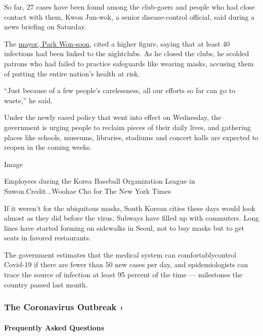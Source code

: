 So far, 27 cases have been found among the club-goers and people who had
close contact with them, Kwon Jun-wok, a senior disease-control
official, said during a news briefing on Saturday.

The
\href{https://www.nytimes3xbfgragh.onion/2020/07/09/world/asia/seoul-mayor-missing.html}{mayor,
Park Won-soon}, cited a higher figure, saying that at least 40
infections had been linked to the nightclubs. As he closed the clubs, he
scolded patrons who had failed to practice safeguards like wearing
masks, accusing them of putting the entire nation's health at risk.

``Just because of a few people's carelessness, all our efforts so far
can go to waste,'' he said.

Under the newly eased policy that went into effect on Wednesday, the
government is urging people to reclaim pieces of their daily lives, and
gathering places like schools, museums, libraries, stadiums and concert
halls are expected to reopen in the coming weeks.

Image

Employees during the Korea Baseball Organization League in
Suwon.Credit...Woohae Cho for The New York Times

If it weren't for the ubiquitous masks, South Korean cities these days
would look almost as they did before the virus. Subways have filled up
with commuters. Long lines have started forming on sidewalks in Seoul,
not to buy masks but to get seats in favored restaurants.

​The government estimates that the medical system can ​comfortably
​control Covid-19 if there are fewer than 50 new cases per day, and
epidemiologists can trace the source of infection at least 95 percent of
the time --- milestones the country passed last month.

\href{https://www.nytimes3xbfgragh.onion/news-event/coronavirus?action=click\&pgtype=Article\&state=default\&region=MAIN_CONTENT_3\&context=storylines_faq}{}

\hypertarget{the-coronavirus-outbreak-}{%
\subsubsection{The Coronavirus Outbreak
›}\label{the-coronavirus-outbreak-}}

\hypertarget{frequently-asked-questions}{%
\paragraph{Frequently Asked
Questions}\label{frequently-asked-questions}}

